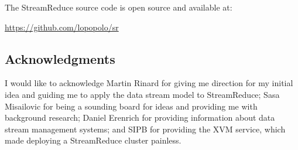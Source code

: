 \documentclass[12pt,twocolumn]{article}
\begin{document}
The StreamReduce source code is open source and available at:
\begin{center}
  \url{https://github.com/lopopolo/sr}
\end{center}

\subsection*{Acknowledgments}
I would like to acknowledge Martin Rinard for giving me direction for my initial idea
and guiding me to apply the data stream model to StreamReduce; Sasa Misailovic for being
a sounding board for ideas and providing me with background research; Daniel Erenrich for
providing information about data stream management systems; and SIPB for providing the
XVM service, which made deploying a StreamReduce cluster painless.

{}

\end{document}
